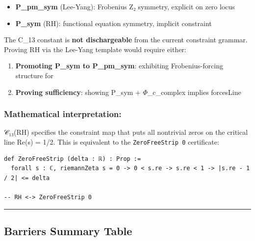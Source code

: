 \documentclass[12pt,a4paper]{article}
\begin{document}
\begin{itemize}
    \item \textbf{P\_pm\_sym} (Lee-Yang): Frobenius Z₂ symmetry, explicit on zero locus
    \item \textbf{P\_sym} (RH): functional equation symmetry, implicit constraint
\end{itemize}

The C\_13 constant is \textbf{not dischargeable} from the current constraint grammar. Proving RH via the Lee-Yang template would require either:

\begin{enumerate}
    \item \textbf{Promoting P\_sym to P\_pm\_sym}: exhibiting Frobenius-forcing structure for \zeta
    \item \textbf{Proving sufficiency}: showing P\_sym + $\Phi$\_c\_complex implies forcesLine
\end{enumerate}

\subsubsection{Mathematical interpretation:}

𝒞₁₃(RH) specifies the constraint map that puts all nontrivial zeros on the critical line Re(s) = 1/2. This is equivalent to the \texttt{ZeroFreeStrip 0} certificate:

\begin{lstlisting}[language=lean]
def ZeroFreeStrip (delta : ℝ) : Prop :=
  forall s : ℂ, riemannZeta s = 0 -> 0 < s.re -> s.re < 1 -> |s.re - 1 / 2| <= delta

-- RH <-> ZeroFreeStrip 0
\end{lstlisting}

\begin{center}
\rule{0.5\textwidth}{0.4pt}
\end{center}

\subsection{Barriers Summary Table}
\end{document}
